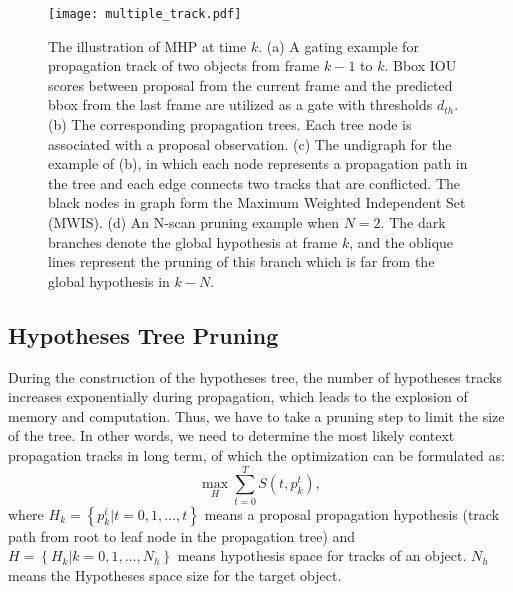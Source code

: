 \documentclass[10pt,twocolumn,letterpaper]{article}
\begin{document}
\begin{figure*}[t]
\vspace{-15pt}
\centering
\texttt{[image: multiple\_track.pdf]}
\vspace{-24pt}
\caption{The illustration of MHP at time $k$. (a) A gating example for propagation track of two objects from frame $k-1$ to $k$. Bbox IOU scores between proposal from the current frame and the predicted bbox from the last frame are utilized as a gate with thresholds ${d_{th}}$. (b) The corresponding propagation trees. Each tree node is associated with a proposal observation. (c) The undigraph for the example of (b), in which each node represents a propagation path in the tree and each edge connects two tracks that are conflicted. The black nodes in graph form the Maximum Weighted Independent Set (MWIS). (d) An N-scan pruning example when $N=2$. The dark branches denote the global hypothesis at frame $k$, and the oblique lines represent the pruning of this branch which is far from the global hypothesis in $k-N$.} 
\label{fig:hypothesis}
\vspace{-7pt}
\end{figure*}

\subsection{Hypotheses Tree Pruning}
\label{tree_pruning}
\vspace{-5pt}

During the construction of the hypotheses tree, the number of hypotheses tracks increases exponentially during propagation, which leads to the explosion of memory and computation. Thus, we have to take a pruning step to limit the size of the tree. In other words, we need to determine the most likely context propagation tracks in long term, of which the optimization can be formulated as:
\begin{equation}
\label{score}
\mathop {\text{max}}\limits_{{H}} \sum\limits_{t = 0}^T {S\left( {t,p_k^{{t}}} \right)},
\end{equation}
where $H_k = \left\{ {p_k^{{i}}|t = 0,1, \ldots ,t} \right\}$ means a proposal propagation hypothesis (track path from root to leaf node in the propagation tree) and ${H} = \left\{ {H_k|k = 0,1, \ldots ,{N_h}} \right\}$ means hypothesis space for tracks of an object. $N_h$ means the Hypotheses space size for the target object.
\end{document}
